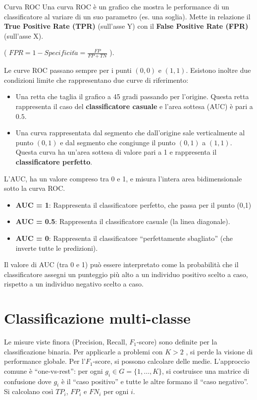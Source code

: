 \begin{definizione}{Curva ROC}{}
Una curva ROC è un grafico che mostra le performance di un classificatore
al variare di un suo parametro (es. una soglia). Mette in relazione il
\textbf{True Positive Rate (TPR)} (sull'asse Y) con il \textbf{False Positive
Rate (FPR)} (sull'asse X).

( $FPR = 1 - Specificit\grave{a} = \frac{FP}{FP+TN}$ ).

Le curve ROC passano sempre per i punti $(0,0)$ e $(1,1)$. Esistono inoltre due
condizioni limite che rappresentano due curve di riferimento:

\begin{itemize}
    \item Una retta che taglia il grafico a 45 gradi passando per l'origine.
    Questa retta rappresenta il caso del \textbf{classificatore casuale} e
    l'area sottesa (AUC) è pari a $0.5$.
    \item Una curva rappresentata dal segmento che dall'origine sale
    verticalmente al punto $(0,1)$ e dal segmento che congiunge il punto
    $(0,1)$ a $(1,1)$. Questa curva ha un'area sottesa di valore pari a 1 e
    rappresenta il \textbf{classificatore perfetto}.
\end{itemize}
\end{definizione}


L'AUC, ha un valore compreso tra 0 e 1, e misura l'intera area bidimensionale
sotto la curva ROC.
\begin{itemize}
    \item \textbf{AUC = 1}: Rappresenta il classificatore perfetto, che
    passa per il punto (0,1)
    \item \textbf{AUC = 0.5}: Rappresenta il classificatore casuale
    (la linea diagonale).
    \item \textbf{AUC = 0}: Rappresenta il classificatore
    ``perfettamente sbagliato'' (che inverte tutte le predizioni).
\end{itemize}
Il valore di AUC (tra 0 e 1) può essere interpretato come la probabilità
che il classificatore assegni un punteggio più alto a un individuo positivo
scelto a caso, rispetto a un individuo negativo scelto a caso.

\section{Classificazione multi-classe}

Le misure viste finora (Precision, Recall, $F_1$-score) sono definite per la
classificazione binaria. Per applicarle a problemi con $K > 2$ , si
perde la visione di performance globale.
Per l'$F_1$-score, si possono calcolare delle medie. L'approccio
comune è ``one-vs-rest'': per ogni  $g_i \in G = \{ 1, \ldots, K \}$,
si costruisce una matrice di confusione dove $g_i$ è il ``caso positivo'' e
tutte le altre  formano il ``caso negativo''.
Si calcolano così $TP_i$, $FP_i$ e $FN_i$ per ogni  $i$.

